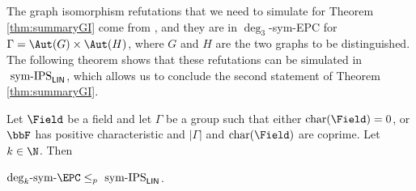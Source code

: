 \documentclass[a4paper,UKenglish,cleveref, autoref, thm-restate]{lipics-v2021}
\newcommand{\symIPSlin}{\text{ \upshape sym-IPS}_{\mathsf{LIN}}}
\DeclareMathOperator{\charact}{char}
\begin{document}
The graph isomorphism refutations that we need to simulate for Theorem \ref{thm:summaryGI} come from \cite[Theorem 1]{Pago}, and they are in $\deg_3$-sym-EPC for $\Gamma=\Aut(G) \times \Aut(H)$, where $G$ and $H$ are the two graphs to be distinguished.
The following theorem shows that these refutations can be simulated in$\symIPSlin$, which allows us to conclude the second statement of Theorem \ref{thm:summaryGI}. 
\begin{theorem} 
	\label{thm:symdegEPC<=symIPS}
	Let $\Field$ be a field and let $\Gamma$ be a group
	such that either $\charact(\Field) = 0$, or $\bbF$ has positive characteristic and $|\Gamma|$ and $\charact(\Field)$ are coprime. Let $k \in \N$. Then
	\begin{center}
		$\mathrm{deg}_k \text{-}\mathrm{sym}\text{-}\EPC  \leq_p  \symIPSlin$.
	\end{center}
\end{theorem}
\end{document}
